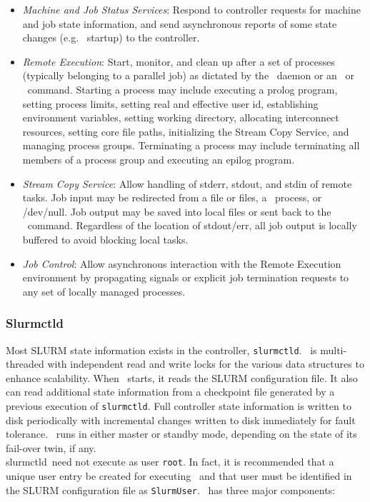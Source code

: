 \begin{itemize}
\item {\em Machine and Job Status Services}:  Respond to controller 
requests for machine and job state information, and send asynchronous 
reports of some state changes (e.g. \slurmd\ startup) to the controller.

\item {\em Remote Execution}: Start, monitor, and clean up after a set
of processes (typically belonging to a parallel job) as dictated by the
\slurmctld\ daemon or an \srun\ or \scancel\ command. Starting a process may
include executing a prolog program, setting process limits, setting real
and effective user id, establishing environment variables, setting working
directory, allocating interconnect resources, setting core file paths,
initializing the Stream Copy Service, and managing
process groups. Terminating a process may include terminating all members
of a process group and executing an epilog program.

\item {\em Stream Copy Service}: Allow handling of stderr, stdout, and
stdin of remote tasks. Job input may be redirected from a file or files, a
\srun\ process, or /dev/null.  Job output may be saved into local files or
sent back to the \srun\ command. Regardless of the location of stdout/err,
all job output is locally buffered to avoid blocking local tasks.

\item {\em Job Control}: Allow asynchronous interaction with the
Remote Execution environment by propagating signals or explicit job
termination requests to any set of locally managed processes.

\end{itemize}

\subsubsection{Slurmctld}

Most SLURM state information exists in the controller, {\tt slurmctld}.
\slurmctld\ is multi-threaded with independent read and write locks 
for the various data structures to enhance scalability. 
When \slurmctld\ starts, it reads the SLURM configuration file.  
It also can read additional state information
from a checkpoint file generated by a previous execution of {\tt slurmctld}.
Full controller state information is written to 
disk periodically with incremental changes written to disk immediately
for fault tolerance.  
\slurmctld\ runs in either master or standby mode, depending on the
state of its fail-over twin, if any.
\\slurmctld\ need not execute as user {\tt root}. 
In fact, it is recommended that a unique user entry be created for 
executing \slurmctld\ and that user must be identified in the SLURM 
configuration file as {\tt SlurmUser}.
\slurmctld\ has three major components:

